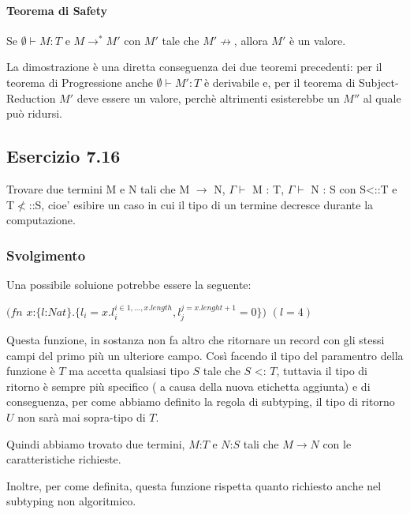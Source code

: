 \paragraph{Teorema di Safety}
\begin{centering}
	Se $\emptyset \vdash M :T$ e $M \to^* M'$ con $M'$ tale che $M' \not\to$, allora $M'$ \`e un valore.
\end{centering}

\noindent La dimostrazione \`e una diretta conseguenza dei due teoremi precedenti: per il teorema di Progressione anche $\emptyset \vdash M': T$ \`e derivabile e, per il teorema di Subject-Reduction $M'$ deve essere un valore, perch\`e altrimenti esisterebbe un $M''$ al quale pu\`o ridursi.


\subsection*{Esercizio 7.16}
Trovare due termini M e N tali che M $\rightarrow$ N, $\Gamma\vdash$ M : T, $\Gamma\vdash$ N : S con S<::T e T$\nless$::S, cioe' esibire un caso in cui il tipo di un termine decresce durante la computazione. 
\subsubsection*{Svolgimento}
Una possibile soluione potrebbe essere la seguente:

$ (fn$ $x$:$\{l$:$Nat\}.\{l_i = x.l_i^{i \in 1,...,x.length},l_j^{j=x.lenght+1} = 0\})$ $({l=4})$

Questa funzione, in sostanza non fa altro che ritornare un record con gli stessi campi del primo pi\`u un ulteriore campo.
Cos\`i facendo il tipo del paramentro della funzione \`e $T$  ma accetta qualsiasi tipo $S$ tale che $S$ <: $T$, tuttavia il tipo di ritorno \`e sempre pi\`u specifico ( a causa della nuova etichetta aggiunta) e di conseguenza, per come abbiamo definito la regola di subtyping, il tipo di ritorno $U$ non sar\`a mai sopra-tipo di $T$.

Quindi abbiamo trovato due termini, $M$:$T$ e $N$:$S$ tali che $M \rightarrow N$ con le caratteristiche richieste.

Inoltre, per come definita, questa funzione rispetta quanto richiesto anche nel subtyping non algoritmico.